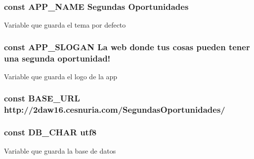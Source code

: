 \subsubsection[{A\+P\+P\+\_\+\+N\+A\+M\+E}]{\setlength{\rightskip}{0pt plus 5cm}const A\+P\+P\+\_\+\+N\+A\+M\+E \textquotesingle{}Segundas Oportunidades\textquotesingle{}}\label{_config_8php_aec1351293f88691205169becf08d525d}
Variable que guarda el tema por defecto \hypertarget{_config_8php_ab4ed970440bc54e9b4f4c4533b32ed7f}{}
\subsubsection[{A\+P\+P\+\_\+\+S\+L\+O\+G\+A\+N}]{\setlength{\rightskip}{0pt plus 5cm}const A\+P\+P\+\_\+\+S\+L\+O\+G\+A\+N \textquotesingle{}La web donde tus cosas pueden tener una segunda oportunidad!\textquotesingle{}}\label{_config_8php_ab4ed970440bc54e9b4f4c4533b32ed7f}
Variable que guarda el logo de la app \hypertarget{_config_8php_ac2f7c46cdf071163a82cb95295eca57f}{}
\subsubsection[{B\+A\+S\+E\+\_\+\+U\+R\+L}]{\setlength{\rightskip}{0pt plus 5cm}const B\+A\+S\+E\+\_\+\+U\+R\+L \textquotesingle{}http\+://2daw16.\+cesnuria.\+com/\+Segundas\+Oportunidades/\textquotesingle{}}\label{_config_8php_ac2f7c46cdf071163a82cb95295eca57f}
\hypertarget{_config_8php_ac39b082e3110f9c9d60da88c896ec24b}{}
\subsubsection[{D\+B\+\_\+\+C\+H\+A\+R}]{\setlength{\rightskip}{0pt plus 5cm}const D\+B\+\_\+\+C\+H\+A\+R \textquotesingle{}utf8\textquotesingle{}}\label{_config_8php_ac39b082e3110f9c9d60da88c896ec24b}
Variable que guarda la base de datos \hypertarget{_config_8php_a293363d7988627f671958e2d908c202a}{}
